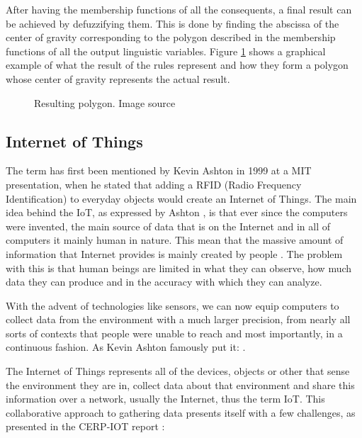 \documentclass[conference]{IEEEtran}
\let\Oldsubsection\subsection
\renewcommand{\subsection}{\FloatBarrier\Oldsubsection}
\begin{document}
After having the membership functions of all the consequents, a final result can be achieved by defuzzifying
them. This is done by finding the abscissa of the center of gravity corresponding to the polygon described in the
membership functions of all the output linguistic variables. Figure \ref{fig:fuzzy_to_end} shows a graphical
example of what the result of the rules represent and how they form a polygon whose center of gravity
represents the actual result.

\begin{figure}[h!]
\label{fig:fuzzy_to_end}
\centerline{}
      \caption[MainModule]{Resulting polygon. Image source \cite{website:defuzzimg}}
\label{fig:fuzzy_to_end}
\end{figure}

\subsection{Internet of Things}

The term  has first been mentioned by Kevin Ashton in 1999 at a MIT presentation, when
he stated that adding a RFID (Radio Frequency Identification) to everyday objects would create an Internet
of Things. The main idea behind the IoT, as expressed by Ashton \cite{IoTThing}, is that ever since the
computers were invented, the main source of data that is on the Internet and in all of computers it mainly
human in nature. This mean that the massive amount of information that Internet provides is mainly created
by people 
\cite{IoTThing}. The problem with this is that human beings are limited in what they can observe, how much
data they can produce and in the accuracy with which they can analyze.

With the advent of technologies like sensors, we can now equip computers to collect data from the environment
with a much larger precision, from nearly all sorts of contexts that people were unable to reach and most
importantly, in a continuous fashion. As Kevin Ashton famously put it:  \cite{IoTThing}.

The Internet of Things represents all of the devices, objects or other  that sense the environment
they are in, collect data about that environment and share this information over a network, usually the
Internet, thus the term IoT. This collaborative approach to gathering data presents itself with a few
challenges, as presented in the CERP-IOT report \cite{CERPIOT}:
\end{document}
